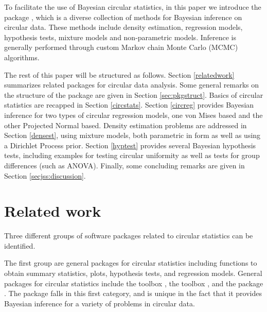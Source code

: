 To facilitate the use of Bayesian circular statistics, in this paper we
introduce the  package , which is a diverse
collection of methods for Bayesian inference on circular data. These
methods include density estimation, regression models, hypothesis tests,
mixture models and non-parametric models. Inference is generally
performed through custom Markov chain Monte Carlo (MCMC) algorithms.

The rest of this paper will be structured as follows. Section
\ref{relatedwork} summarizes related packages for circular data
analysis. Some general remarks on the structure of the package are given
in Section \ref{sec:pkgstruct}. Basics of circular statistics are
recapped in Section \ref{circstats}. Section \ref{circreg} provides
Bayesian inference for two types of circular regression models, one von
Mises based and the other Projected Normal based. Density estimation
problems are addressed in Section \ref{densest}, using mixture models,
both parametric in form as well as using a Dirichlet Process prior.
Section \ref{hyptest} provides several Bayesian hypothesis tests,
including examples for testing circular uniformity as well as tests for
group differences (such as ANOVA). Finally, some concluding remarks are
given in Section \ref{secjss:discussion}.

\hypertarget{related-work}{%
\section{Related work}\label{related-work}}

\label{relatedwork}

Three different groups of software packages related to circular
statistics can be identified.

The first group are general packages for circular statistics including
functions to obtain summary statistics, plots, hypothesis tests, and
regression models. General packages for circular statistics include the
 toolbox  \citep{cox1998circstat}, the
 toolbox  \citep{berens2009circstat},
and the  package  \citep{lund2013package}. The
package  falls in this first category, and is unique in
the fact that it provides Bayesian inference for a variety of problems
in circular data.

